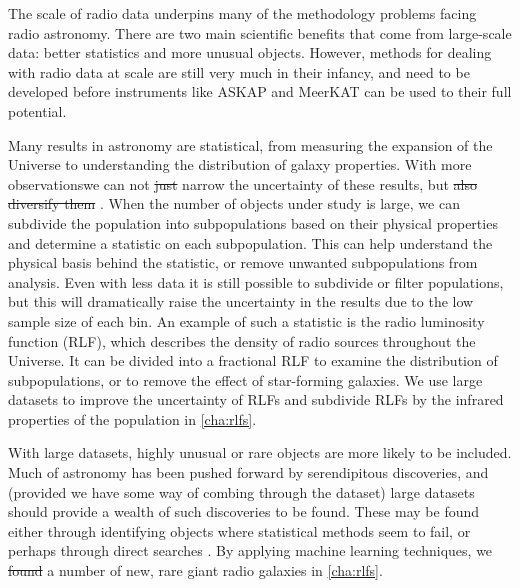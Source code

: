 \documentclass[11pt, a4paper]{book}
\providecommand{\DIFaddtex}[1]{{\protect\color{blue}\uwave{#1}}} %
\providecommand{\DIFdeltex}[1]{{\protect\color{red}\sout{#1}}}                      %
\providecommand{\DIFaddbegin}{} %
\providecommand{\DIFaddend}{} %
\providecommand{\DIFdelbegin}{} %
\providecommand{\DIFdelend}{} %
\providecommand{\DIFadd}[1]{\texorpdfstring{\DIFaddtex{#1}}{#1}} %
\providecommand{\DIFdel}[1]{\texorpdfstring{\DIFdeltex{#1}}{}} %
\newcommand{\DIFscaledelfig}{0.5}
\newlength{\DIFdelgraphicswidth} %
\newlength{\DIFdelgraphicsheight} %
\newcommand{\DIFaddincludegraphics}[2][]{{\color{blue}\fbox{\DIFOincludegraphics[#1]{#2}}}} %
\newcommand{\DIFdelincludegraphics}[2][]{%
\sbox{\DIFdelgraphicsbox}{\DIFOincludegraphics[#1]{#2}}%
\settoboxwidth{\DIFdelgraphicswidth}{\DIFdelgraphicsbox} %
\settoboxtotalheight{\DIFdelgraphicsheight}{\DIFdelgraphicsbox} %
\scalebox{\DIFscaledelfig}{%
\parbox[b]{\DIFdelgraphicswidth}{\usebox{\DIFdelgraphicsbox}\\[-\baselineskip] \rule{\DIFdelgraphicswidth}{0em}}\llap{\resizebox{\DIFdelgraphicswidth}{\DIFdelgraphicsheight}{%
\setlength{\unitlength}{\DIFdelgraphicswidth}%
\begin{picture}(1,1)%
\thicklines\linethickness{2pt} %
{\color[rgb]{1,0,0}\put(0,0){\framebox(1,1){}}}%
{\color[rgb]{1,0,0}\put(0,0){\line( 1,1){1}}}%
{\color[rgb]{1,0,0}\put(0,1){\line(1,-1){1}}}%
\end{picture}%
}\hspace*{3pt}}} %
} %
\DeclareRobustCommand{\DIFaddbegin}{\DIFOaddbegin \let\includegraphics\DIFaddincludegraphics} %
\DeclareRobustCommand{\DIFaddend}{\DIFOaddend \let\includegraphics\DIFOincludegraphics} %
\DeclareRobustCommand{\DIFdelbegin}{\DIFOdelbegin \let\includegraphics\DIFdelincludegraphics} %
\DeclareRobustCommand{\DIFdelend}{\DIFOaddend \let\includegraphics\DIFOincludegraphics} %
\begin{document}
    The scale of radio data underpins many of the methodology problems facing radio astronomy. There are two main scientific benefits that come from large-scale data: better statistics and more unusual objects. However, methods for dealing with radio data at scale are still very much in their infancy, and need to be developed before instruments like ASKAP and MeerKAT can be used to their full potential.

    Many results in astronomy are statistical, from measuring the expansion of the Universe to understanding the distribution of galaxy properties. With more observations\DIFaddbegin \DIFadd{, }\DIFaddend we can not \DIFdelbegin \DIFdel{just }\DIFdelend \DIFaddbegin \DIFadd{only }\DIFaddend narrow the uncertainty of these results, but \DIFdelbegin \DIFdel{also diversify them }\DIFdelend \DIFaddbegin \DIFadd{diversify them as well}\DIFaddend . When the number of objects under study is large, we can subdivide the population into subpopulations based on their physical properties and determine a statistic on each subpopulation. This can help understand the physical basis behind the statistic, or 
    remove unwanted subpopulations from analysis. Even with less data it is still possible to subdivide or filter populations, but this will dramatically raise the uncertainty in the results due to the low sample size of each bin. An example of such a statistic is the radio luminosity function (RLF), which describes the density of radio sources throughout the Universe. It can be divided into a fractional RLF to examine the distribution of subpopulations, or to remove the effect of star-forming galaxies. We use large datasets to improve the uncertainty of RLFs and subdivide RLFs by the infrared properties of the population in \autoref{cha:rlfs}.

    With large datasets, highly unusual or rare objects are more likely to be included. Much of astronomy has been pushed forward by serendipitous discoveries, and (provided we have some way of combing through the dataset) large datasets should provide a wealth of such discoveries to be found. These may be found either through identifying objects where statistical methods seem to fail, or perhaps through direct searches \citep{norris17unexpected}. By applying machine learning techniques, we \DIFdelbegin \DIFdel{found }\DIFdelend \DIFaddbegin \DIFadd{find }\DIFaddend a number of new, rare giant radio galaxies in \autoref{cha:rlfs}.
\end{document}
